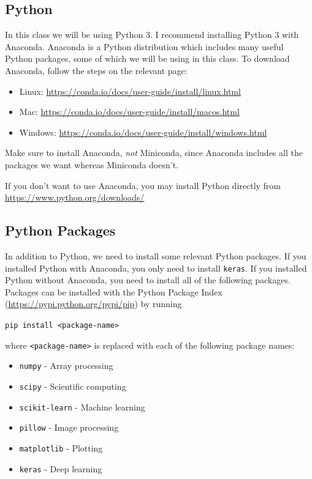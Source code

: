\documentclass{article}
\begin{document}
\subsection{Python}

In this class we will be using Python 3. I recommend installing Python 3 with Anaconda. Anaconda is a Python distribution which includes many useful Python packages, some of which we will be using in this class. To download Anaconda, follow the steps on the relevant page:

\begin{itemize}
	\item Linux: \url{https://conda.io/docs/user-guide/install/linux.html}
	\item Mac: \url{https://conda.io/docs/user-guide/install/macos.html}
	\item Windows: \url{https://conda.io/docs/user-guide/install/windows.html}
\end{itemize}

Make sure to install Anaconda, \textit{not} Miniconda, since Anaconda includes all the packages we want whereas Miniconda doesn't.

If you don't want to use Anaconda, you may install Python directly from \url{https://www.python.org/downloads/}

\subsection{Python Packages}

In addition to Python, we need to install some relevant Python packages. If you installed Python with Anaconda, you only need to install \texttt{keras}. If you installed Python without Anaconda, you need to install all of the following packages. Packages can be installed with the Python Package Index (\url{https://pypi.python.org/pypi/pip}) by running

\vspace{2mm}
\texttt{pip install <package-name>}
\vspace{2mm}

\noindent
where \texttt{<package-name>} is replaced with each of the following package names:

\begin{itemize}
	\item \texttt{numpy} - Array processing
	\item \texttt{scipy} - Scientific computing
	\item \texttt{scikit-learn} - Machine learning
	\item \texttt{pillow} - Image processing
	\item \texttt{matplotlib} - Plotting
	\item \texttt{keras} - Deep learning
\end{itemize}
\end{document}

